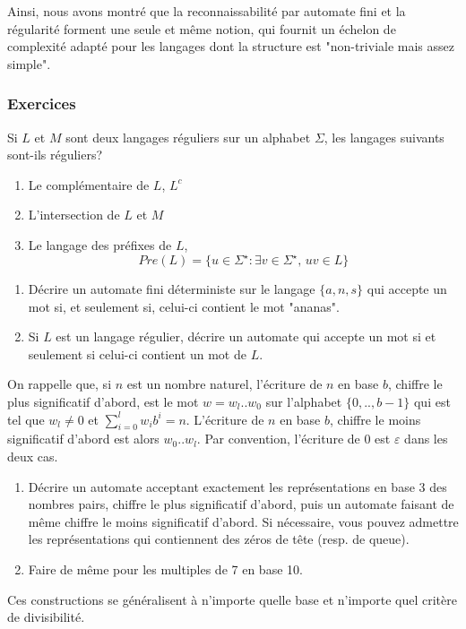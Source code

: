 Ainsi, nous avons montré que la reconnaissabilité par automate fini et la régularité forment une seule et même notion, qui fournit un échelon de complexité adapté pour les langages dont la structure est "non-triviale mais assez simple".

\subsubsection{Exercices}

\begin{exo}
Si $L$ et $M$ sont deux langages réguliers sur un alphabet $\Sigma$, les langages suivants sont-ils réguliers?
\begin{enumerate}
\item Le complémentaire de $L$, $L^c$
\item L'intersection de $L$ et $M$
\item Le langage des préfixes de $L$,
\[Pre(L)=\{u\in\Sigma^\star : \exists v\in\Sigma^\star ,\, uv\in L\}\]
\end{enumerate}
\end{exo}

\begin{exo}
\begin{enumerate}
\item Décrire un automate fini déterministe sur le langage $\{a,n,s\}$ qui accepte un mot si, et seulement si, celui-ci contient le mot "ananas".
\item Si $L$ est un langage régulier, décrire un automate qui accepte un mot si et seulement si celui-ci contient un mot de $L$.
\end{enumerate}
\end{exo}

\begin{exo}
On rappelle que, si $n$ est un nombre naturel, l'écriture de $n$ en base $b$, chiffre le plus significatif d'abord, est le mot $w=w_l..w_0$ sur l'alphabet $\{0,..,b-1\}$ qui est tel que $w_l\neq 0$ et $\sum_{i=0}^l w_ib^i=n$. L'écriture de $n$ en base $b$, chiffre le moins significatif d'abord est alors  $w_0..w_l$. Par convention, l'écriture de 0 est $\varepsilon$ dans les deux cas.

\begin{enumerate}
\item Décrire un automate acceptant exactement les représentations en base 3 des nombres pairs, chiffre le plus significatif d'abord, puis un automate faisant de même chiffre le moins significatif d'abord. Si nécessaire, vous pouvez admettre les représentations qui contiennent des zéros de tête (resp. de queue).
\item Faire de même pour les multiples de 7 en base 10.
\end{enumerate}

Ces constructions se généralisent à n'importe quelle base et n'importe quel critère de divisibilité.
\end{exo}

